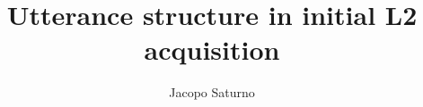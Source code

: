 \author{Jacopo Saturno} %
\title{Utterance structure in initial L2 acquisition}  

\renewcommand{\lsSeries}{eurosla} %
\renewcommand{\lsSeriesNumber}{265} %



